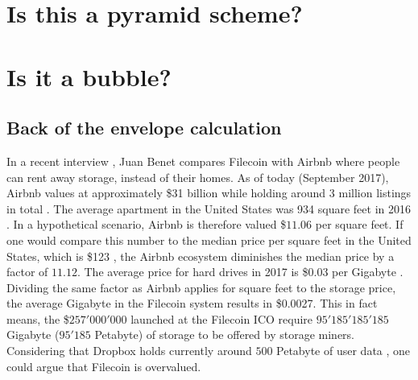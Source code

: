 \documentclass[conference]{IEEEtran}
\begin{document}
\section{Is this a pyramid scheme?}

\section{Is it a bubble?}

\subsection{Back of the envelope calculation}

In a recent interview \cite{podcast}, Juan Benet compares Filecoin with Airbnb \cite{airbnb} where people can rent away storage, instead of their homes.
As of today (September 2017), Airbnb values at approximately \$31 billion while holding around 3 million listings in total \cite{airbnb-valuation}.
The average apartment in the United States was 934 square feet in 2016 \cite{housing-cnbc}.
In a hypothetical scenario, Airbnb is therefore valued \$$11.06$ per square feet. 
If one would compare this number to the median price per square feet in the United States, which is \$123 \cite{home-prices}, the Airbnb ecosystem diminishes the median price by a factor of $11.12$.
The average price for hard drives in 2017 is \$0.03 per Gigabyte \cite{hard-drive}.
Dividing the same factor as Airbnb applies for square feet to the storage price, the average Gigabyte in the Filecoin system results in \$0.0027.
This in fact means, the \$$257'000'000$ launched at the Filecoin ICO require $95'185'185'185$ Gigabyte ($95'185$ Petabyte) of storage to be offered by storage miners.
Considering that Dropbox \cite{dropbox} holds currently around $500$ Petabyte of user data \cite{dropbox-userdata}, one could argue that Filecoin is overvalued.


\ifCLASSOPTIONcaptionsoff
  \newpage
\fi


\end{document}
